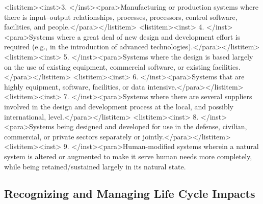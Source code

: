 <listitem><inst>3. 	</inst><para>Manufacturing or production systems where there is input–output relationships, processes, processors, control software, facilities, and people.</para></listitem>
<listitem><inst>	4.	</inst><para>Systems where a great deal of new design and development effort is required (e.g., in the introduction of advanced technologies).</para></listitem>
<listitem><inst>	5.	</inst><para>Systems where the design is based largely on the use of existing equipment, commercial software, or existing facilities.</para></listitem>
<listitem><inst>	6.	</inst><para>Systems that are highly equipment, software, facilities, or data intensive.</para></listitem>
<listitem><inst>	7.	</inst><para>Systems where there are several suppliers involved in the design and development process at the local, and possibly international, level.</para></listitem>
<listitem><inst>	8.	</inst><para>Systems being designed and developed for use in the defense, civilian, commercial, or private sectors separately or jointly.</para></listitem>
<listitem><inst>	9.	</inst><para>Human-modified systems wherein a natural system is altered or augmented to make it serve human needs more completely, while being retained/sustained largely in its natural state.

\subsection{Recognizing and Managing Life Cycle Impacts}

